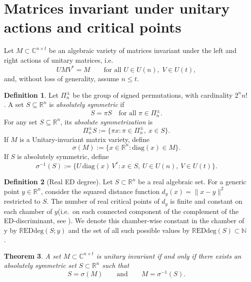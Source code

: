 \documentclass[11pt]{amsart}
\def\N{\mathbb N}\let\en\N
\theoremstyle{plain}
\newtheorem{theorem}{Theorem}
\theoremstyle{definition}
\newtheorem{definition}[theorem]{Definition}
\theoremstyle{remark}
\begin{document}
\section{Matrices invariant under unitary actions and critical points }

Let $M\subset \mathbb{C}^{n\times t}$ be an algebraic variety of matrices invariant under the left and right actions of unitary matrices, i.e.
\[
U M V^* = M \qquad \text{for all } U\in U(n),\; V\in U(t),
\]
and, without loss of generality, assume $n\le t$.


\begin{definition}
Let $\Pi^\pm_n$ be the group of signed permutations, with cardinality $2^n n!$.
A set \( S \subseteq \mathbb{R}^n \) is \emph{absolutely symmetric} if
\[
S = \pi S \quad \text{for all } \pi \in \Pi^\pm_n.
\]
For any set \( S \subseteq \mathbb{R}^n \), its \emph{absolute symmetrization} is
\[
\Pi^\pm_n S := \{ \pi x : \pi \in \Pi^\pm_n,\ x \in S \}.
\]
If $M$ is a Unitary-invariant matrix variety, define
\[
\sigma(M):=\{x\in \mathbb{R}^n:\mathrm{diag}(x)\in M\}.
\]
If $S$ is absolutely symmetric, define
\[
\sigma^{-1}(S):=\{U\,\mathrm{diag}(x)\,V^*: x\in S,\ U\in U(n),\ V\in U(t)\}.
\]
\end{definition}

\begin{definition}[Real ED degree]
Let $S \subset \mathbb{R}^n$ be a real algebraic set.
For a generic point $y \in \mathbb{R}^n$, consider the squared distance
function $d_y(x) = \|x - y\|^2$ restricted to $S$.
The number of real critical points of $d_y$
is finite and constant on each  chamber of $y$(i.e.\ on each connected component of the complement of the ED-discriminant, see \cite{draisma2016euclidean}).
We denote this chamber-wise constant in the chamber of y  by 
$\mathrm{\mathbb{R}EDdeg}(S;y)$ and the set of all such possible values by
$\mathrm{\mathbb{R}EDdeg}(S)\subset\N$
.
 


\end{definition}


\begin{theorem}
A set $M \subset \mathbb{C}^{n\times t}$ is unitary invariant if and only if there exists
an absolutely symmetric set $S\subset \mathbb{R}^n$ such that
\[
S=\sigma(M)
\qquad\text{and}\qquad
M=\sigma^{-1}(S).
\]
\end{theorem}
\end{document}
